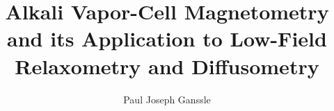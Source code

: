 \title{Alkali Vapor-Cell Magnetometry and its Application to Low-Field Relaxometry and Diffusometry}
\author{Paul Joseph Ganssle} %
